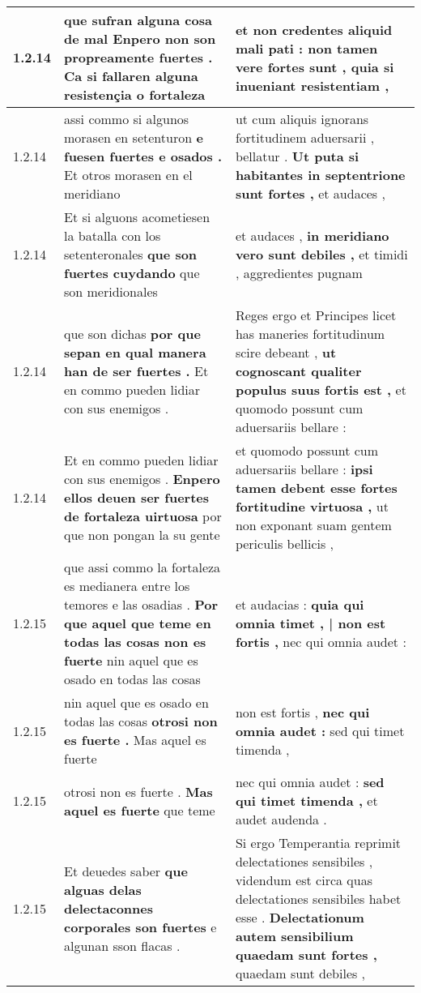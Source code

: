 \begin{tabular}{|p{1cm}|p{6.5cm}|p{6.5cm}|}
1.2.14 & que sufran alguna cosa de mal \textbf{ Enpero non son propreamente fuertes . } Ca si fallaren alguna resistençia o fortaleza & et non credentes aliquid mali pati : \textbf{ non tamen vere fortes sunt , } quia si inueniant resistentiam , \\\hline
1.2.14 & assi commo si algunos morasen en setenturon \textbf{ e fuesen fuertes e osados . } Et otros morasen en el meridiano & ut cum aliquis ignorans fortitudinem aduersarii , bellatur . \textbf{ Ut puta si habitantes in septentrione sunt fortes , } et audaces , \\\hline
1.2.14 & Et si alguons acometiesen la batalla con los setenteronales \textbf{ que son fuertes cuydando } que son meridionales & et audaces , \textbf{ in meridiano vero sunt debiles , } et timidi , aggredientes pugnam \\\hline
1.2.14 & que son dichas \textbf{ por que sepan en qual manera han de ser fuertes . } Et en commo pueden lidiar con sus enemigos . & Reges ergo et Principes licet has maneries fortitudinum scire debeant , \textbf{ ut cognoscant qualiter populus suus fortis est , } et quomodo possunt cum aduersariis bellare : \\\hline
1.2.14 & Et en commo pueden lidiar con sus enemigos . \textbf{ Enpero ellos deuen ser fuertes de fortaleza uirtuosa } por que non pongan la su gente & et quomodo possunt cum aduersariis bellare : \textbf{ ipsi tamen debent esse fortes fortitudine virtuosa , } ut non exponant suam gentem periculis bellicis , \\\hline
1.2.15 & que assi commo la fortaleza es medianera entre los temores e las osadias . \textbf{ Por que aquel que teme en todas las cosas non es fuerte } nin aquel que es osado en todas las cosas & et audacias : \textbf{ quia qui omnia timet , | non est fortis , } nec qui omnia audet : \\\hline
1.2.15 & nin aquel que es osado en todas las cosas \textbf{ otrosi non es fuerte . } Mas aquel es fuerte & non est fortis , \textbf{ nec qui omnia audet : } sed qui timet timenda , \\\hline
1.2.15 & otrosi non es fuerte . \textbf{ Mas aquel es fuerte } que teme & nec qui omnia audet : \textbf{ sed qui timet timenda , } et audet audenda . \\\hline
1.2.15 & Et deuedes saber \textbf{ que alguas delas delectaconnes corporales son fuertes } e algunan sson flacas . & Si ergo Temperantia reprimit delectationes sensibiles , videndum est circa quas delectationes sensibiles habet esse . \textbf{ Delectationum autem sensibilium quaedam sunt fortes , } quaedam sunt debiles , \\\hline

\end{tabular}
